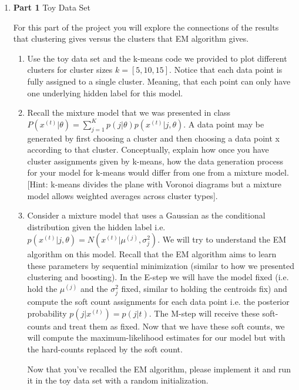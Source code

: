 \begin{enumerate}

\item {\bf Part 1} Toy Data Set

For this part of the project you will explore the connections of the results that clustering gives versus the clusters that EM algorithm gives.

\begin{enumerate}
  \item Use the toy data set and the k-means code we provided to plot different clusters for cluster sizes $k = [5, 10, 15]$. Notice that each data point is fully assigned to a single cluster. Meaning, that each point can only have one underlying hidden label for this model.
  \item Recall the mixture model that we was presented in class $P(x^{(t)} | \theta) = \sum^{K}_{j=1} p(j| \theta)p(x^{(t)} | j, \theta) $. A data point may be generated by first choosing a cluster and then choosing a data point x according to that cluster. Conceptually, explain how once you have cluster assignments given by k-means, how the data generation process for your model for k-means would differ from one from a mixture model. [Hint: k-means divides the plane with Voronoi diagrams but a mixture model allows weighted averages across cluster types].
  \item Consider a mixture model that uses a Gaussian as the conditional distribution given the hidden label i.e. $p(x^{(t)} | j, \theta) = N(x^{(t)}| \mu^{(j)}, \sigma^2_{j})$.  We will try to understand the EM algorithm on this model. 
 Recall that the EM algorithm aims to learn these parameters by sequential minimization (similar to how we presented clustering and boosting). 
In the E-step we will have the model fixed (i.e. hold the $ \mu^{(j)}$ and the $\sigma^2_{j}$ fixed, similar to holding the centroids fix) and compute the soft count assignments for each data point i.e. the posterior probability $p(j | x^{(t)}) = p(j|t)$. The M-step will receive these soft-counts and treat them as fixed. Now that we have these soft counts, we will compute the maximum-likelihood estimates for our model but with the hard-counts replaced by the soft count. 

Now that you've recalled the EM algorithm, please implement it and run it in the toy data set with a random initialization. 


\end{enumerate}
\end{enumerate}

